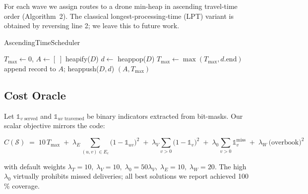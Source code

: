 For each wave we assign routes to a drone min-heap in ascending
travel-time order (Algorithm~2).  
The classical longest-processing-time (LPT) variant is obtained by
reversing line 2; we leave this to future work.

\begin{algorithm}[H]
    \caption{AscendingTimeScheduler}
    \label{alg:scheduler}
    \begin{algorithmic}[1]
      \State $T_{\max}\gets0$, $A\gets[\;]$
          \State heapify($D$) 
               \State $d \gets$ heappop($D$)
               \State {} 
               \State $T_{\max}\gets\max(T_{\max}, d.\text{end})$
               \State append record to $A$; heappush($D,d$)
          \EndFor
      \EndFor
      \State \Return $(A, T_{\max})$
    \EndProcedure
\end{algorithmic}
\end{algorithm}
    

\subsection{Cost Oracle}\label{sec:cost}

Let \(\mathbb 1_{v\text{ served}}\) and
\(\mathbb 1_{uv\text{ traversed}}\) be binary indicators extracted from
bit-masks.
Our scalar objective mirrors the code:

\begin{equation}
    \label{eq:cost}
    \boxed{
    C(\mathcal{S}) \;=\;
    10\,T_{\max}
    \;+\;
    \lambda_E \sum_{(u,v)\in E_c}
           \bigl(1-\mathbb 1_{uv}\bigr)^{\!2}
    \;+\;
    \lambda_V \sum_{v>0}
           \bigl(1-\mathbb 1_{v}\bigr)^{\!2}
    \;+\;
    \lambda_0 \sum_{v>0}
           \mathbb 1_{v}^{\mathrm{miss}}
    \;+\;
    \lambda_W \,
            \bigl(\text{overbook}\bigr)^{2}}
    \end{equation}
    

\noindent with default weights
\(\lambda_T\!=\!10,\;
 \lambda_V\!=\!10,\;
 \lambda_0\!=\!50\lambda_V,\;
 \lambda_E\!=\!10,\;
 \lambda_W\!=\!20\).
The high \(\lambda_0\) virtually prohibits missed deliveries; all best
solutions we report achieved 100 \% coverage.

